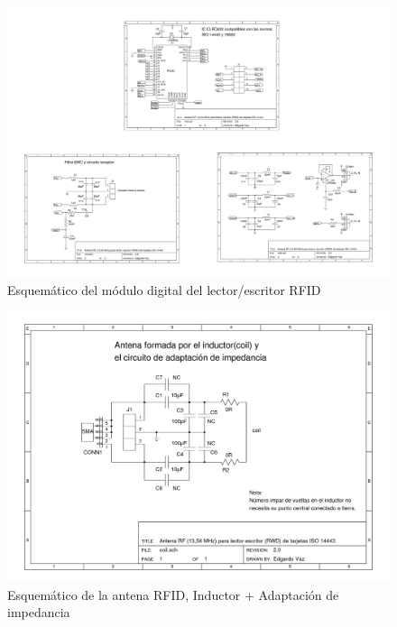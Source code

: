 \begin{figure}[H]
\centering
  \begin{center}
  \includegraphics[angle=90]{Imagenes/rfid_rwd.jpg}
  \end{center}
  \caption{Esquemático del módulo digital del lector/escritor RFID}\label{Fig:RFID} 
\end{figure}

\begin{figure}[H]
\centering
  \begin{center}
  \includegraphics[angle=90]{Imagenes/rfid_coil.jpg}
  \end{center}
  \caption{Esquemático de la antena RFID, Inductor + Adaptación de impedancia}\label{Fig:RFID2} 
\end{figure}

